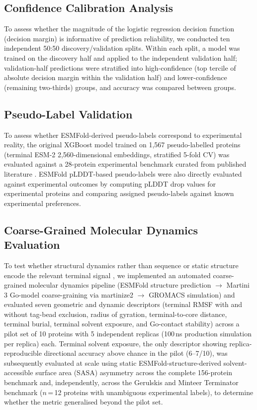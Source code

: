 \documentclass[unnumsec,webpdf,contemporary,large]{oup-authoring-template}
\begin{document}
\subsection{Confidence Calibration Analysis}
To assess whether the magnitude of the logistic regression decision function (decision margin) is informative of prediction reliability, we conducted ten independent 50:50 discovery/validation splits. Within each split, a model was trained on the discovery half and applied to the independent validation half; validation-half predictions were stratified into high-confidence (top tercile of absolute decision margin within the validation half) and lower-confidence (remaining two-thirds) groups, and accuracy was compared between groups.

\subsection{Pseudo-Label Validation}
To assess whether ESMFold-derived pseudo-labels correspond to experimental reality, the original XGBoost \citep{chen2016} model trained on 1,567 pseudo-labelled proteins (terminal ESM-2 2,560-dimensional embeddings, stratified 5-fold CV) was evaluated against a 28-protein experimental benchmark curated from published literature \citep{gerulskis2025,woestenenk2004}. ESMFold pLDDT-based pseudo-labels were also directly evaluated against experimental outcomes by computing pLDDT drop values for experimental proteins and comparing assigned pseudo-labels against known experimental preferences.

\subsection{Coarse-Grained Molecular Dynamics Evaluation}
To test whether structural dynamics rather than sequence or static structure encode the relevant terminal signal \citep{thielges2011}, we implemented an automated coarse-grained molecular dynamics pipeline (ESMFold structure prediction $\rightarrow$ Martini 3 Go-model coarse-graining via martinize2 \citep{souza2021,kroon2023,yang2025} $\rightarrow$ GROMACS \citep{berendsen1995} simulation) and evaluated seven geometric and dynamic descriptors (terminal RMSF with and without tag-bead exclusion, radius of gyration, terminal-to-core distance, terminal burial, terminal solvent exposure, and Go-contact stability) across a pilot set of 10 proteins with 5 independent replicas (100\,ns production simulation per replica) each. Terminal solvent exposure, the only descriptor showing replica-reproducible directional accuracy above chance in the pilot (6--7/10), was subsequently evaluated at scale using static ESMFold-structure-derived solvent-accessible surface area (SASA) asymmetry across the complete 156-protein benchmark and, independently, across the Gerulskis and Minteer Terminator benchmark \citep{gerulskis2025} ($n$\,=\,12 proteins with unambiguous experimental labels), to determine whether the metric generalised beyond the pilot set.
\end{document}
